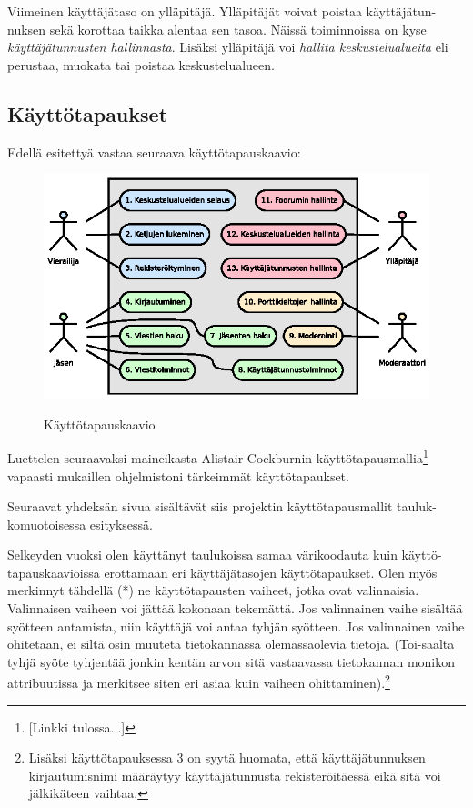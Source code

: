 \documentclass[11pt]{article}
\begin{document}
		Viimeinen käyttäjätaso on ylläpitäjä. Ylläpitäjät voivat poistaa käyttäjätun-nuksen sekä korottaa taikka
		alentaa sen tasoa. Näissä toiminnoissa on kyse \emph{käyttäjätunnusten hallinnasta}. Lisäksi ylläpitäjä
		voi \emph{hallita keskustelualueita} eli perustaa, muokata tai poistaa keskustelualueen.
	
	\subsection{Käyttötapaukset}
		Edellä esitettyä vastaa seuraava käyttötapauskaavio:
		\begin{figure}[H]
			\centering
			\includegraphics[trim = 7mm 0mm 0mm 0mm,scale=1.5]{kayttotapauskaavio.eps}\\
			\caption{Käyttötapauskaavio}
		\end{figure}
	
		Luettelen seuraavaksi maineikasta Alistair Cockburnin käyttötapausmallia\footnote{
		[Linkki tulossa...]}
		vapaasti mukaillen ohjelmistoni tärkeimmät käyttötapaukset.
	
		Seuraavat yhdeksän sivua sisältävät siis projektin käyttötapausmallit tauluk-komuotoisessa esityksessä.
	
		Selkeyden vuoksi olen käyttänyt taulukoissa samaa värikoodauta kuin käyttö-tapauskaavioissa erottamaan
		eri käyttäjätasojen käyttötapaukset. Olen myös merkinnyt tähdellä (*) ne käyttötapausten vaiheet,
		jotka ovat valinnaisia. Valinnaisen vaiheen voi jättää kokonaan tekemättä. Jos valinnainen vaihe
		sisältää syötteen antamista, niin käyttäjä voi antaa tyhjän syötteen. Jos valinnainen vaihe ohitetaan,
		ei siltä osin muuteta tietokannassa olemassaolevia tietoja. (Toi-saalta tyhjä syöte tyhjentää jonkin
		kentän arvon sitä vastaavassa tietokannan monikon attribuutissa ja merkitsee siten eri asiaa kuin
		vaiheen ohittaminen).\footnote{Lisäksi käyttötapauksessa 3 on syytä huomata, että käyttäjätunnuksen
		kirjautumisnimi määräytyy käyttäjätunnusta rekisteröitäessä eikä sitä voi jälkikäteen vaihtaa.}
	
\end{document}
